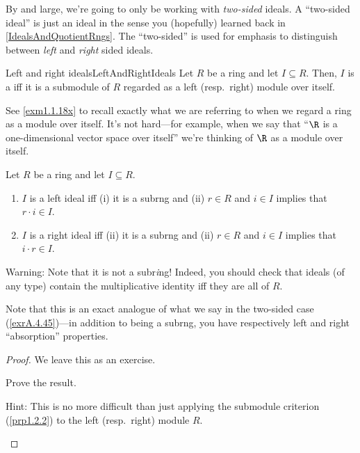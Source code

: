 By and large, we're going to only be working with \emph{two-sided} ideals.  A ``two-sided ideal'' is just an ideal in the sense you (hopefully) learned back in \cref{IdealsAndQuotientRngs}.  The ``two-sided'' is used for emphasis to distinguish between \emph{left} and \emph{right} sided ideals.
\begin{dfn}{Left and right ideals}{LeftAndRightIdeals}
	Let $R$ be a ring and let $I\subseteq R$.  Then, $I$ is a  iff it is a submodule of $R$ regarded as a left (resp.~right) module over itself.
	\begin{rmk}
		See \cref{exm1.1.18x} to recall exactly what we are referring to when we regard a ring as a module over itself.  It's not hard---for example, when we say that ``$\R$ is a one-dimensional vector space over itself'' we're thinking of $\R$ as a module over itself.
	\end{rmk}
\end{dfn}
\begin{prp}{}{}
	Let $R$ be a ring and let $I\subseteq R$.
	\begin{enumerate}
		\item $I$ is a left ideal iff (i) it is a subrng and (ii) $r\in R$ and $i\in I$ implies that $r\cdot i\in I$.
		\item $I$ is a right ideal iff (ii) it is a subrng and (ii) $r\in R$ and $i\in I$ implies that $i\cdot r\in I$.
	\end{enumerate}
	\begin{rmk}
		Warning:  Note that it is not a subr\emph{i}ng!  Indeed, you should check that ideals (of any type) contain the multiplicative identity iff they are all of $R$.
	\end{rmk}
	\begin{rmk}
		Note that this is an exact analogue of what we say in the two-sided case (\cref{exrA.4.45})---in addition to being a subrng, you have respectively left and right ``absorption'' properties.
	\end{rmk}
	\begin{proof}
		We leave this as an exercise.
		\begin{exr}[breakable=false]{}{}
			Prove the result.
			\begin{rmk}
				Hint:  This is no more difficult than just applying the submodule criterion (\cref{prp1.2.2}) to the left (resp.~right) module $R$.
			\end{rmk}
		\end{exr}
	\end{proof}
\end{prp}

